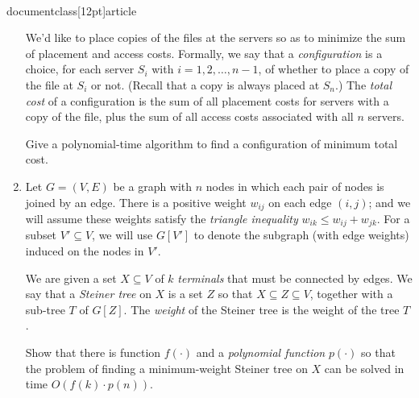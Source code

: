 \\documentclass[12pt]{article}
\begin{document}
\begin{enumerate}
We'd like to place copies of the files at the servers so as to
minimize the sum of placement and access costs.
Formally, we say that a {\em configuration} is a choice,
for each server $S_i$ with $i = 1, 2, \ldots, n-1$,
of whether to place a copy of the file at $S_i$ or not.
(Recall that a copy is always placed at $S_n$.)
The {\em total cost} of a configuration is the sum of
all placement costs for servers with a copy of the file,
plus the sum of all access costs associated with all $n$ servers.

Give a polynomial-time algorithm to find a configuration
of minimum total cost.




\item\Star
Let $G = (V,E)$ be a graph
with $n$ nodes in which
each pair of nodes is joined by an edge.
There is a positive weight $w_{ij}$ on each edge $(i,j)$;
and we will assume these weights satisfy the
{\em triangle inequality}
$w_{ik} \leq w_{ij} + w_{jk}.$
For a subset $V' \subseteq V$, we will use $G[V']$
to denote the subgraph (with edge weights) induced on
the nodes in $V'$.

We are given a set $X \subseteq V$ of $k$ {\em terminals}
that must be connected by edges.
We say that a {\em Steiner tree} on $X$ is a set
$Z$ so that $X \subseteq Z \subseteq V$,
together with a sub-tree $T$ of $G[Z]$.
The {\em weight} of the Steiner tree is the weight of the tree $T$.

Show that there is function $f(\cdot)$ and a
{\em polynomial function} $p(\cdot)$
so that the
problem of finding a minimum-weight
Steiner tree on $X$ can be solved in time $O(f(k) \cdot p(n))$.


\end{enumerate}
\end{document}
